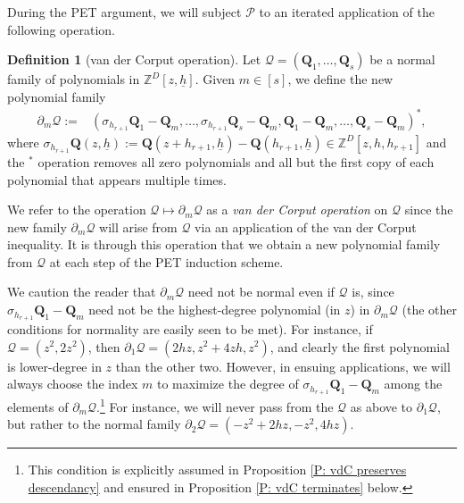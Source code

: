 \documentclass[11pt]{amsart}
\theoremstyle{definition}
\newtheorem{definition}[lemma]{Definition}
\newcommand{\Z}{{\mathbb Z}}
\newcommand{\CP}{{\mathcal P}}
\newcommand{\CQ}{{\mathcal Q}}
\newcommand{\q}{{\mathbf{Q}}}
\newcommand{\uh}{{\underline{h}}}
\begin{document}
 During the PET argument, we will subject $\CP$ to an iterated application of the following operation.
      \begin{definition}[van der Corput operation]
          Let $\CQ = (\q_1, \ldots, \q_s)$ be a normal family of polynomials in $\Z^D[z,\uh]$. Given $m\in[s]$, we define the new polynomial family
      \begin{align*}
            \partial_m\CQ := &(\sigma_{h_{r+1}}{\q}_1-{\q}_m, \ldots, \sigma_{h_{r+1}}{\q}_s - {\q}_m, {\q}_1-{\q}_m, \ldots,  {\q}_s-{\q}_m)^*,
      \end{align*}
      where $\sigma_{h_{r+1}}\q(z, \uh) := \q(z+h_{r+1}, \uh) - \q(h_{r+1}, \uh)\in \mathbb{Z}^D[z,h,h_{r+1}]$
      and the $^*$ operation removes all zero polynomials and all but the first copy of each polynomial that appears multiple times.
            \end{definition}
            We refer to the operation $\CQ\mapsto \partial_m \CQ$ as a \textit{van der Corput operation} on $\CQ$ since the new family $\partial_m \CQ$ will arise from $\CQ$ via an application of the van der Corput inequality. It is through this operation that we obtain a new polynomial family from $\CQ$ at each step of the PET induction scheme.  

            {We caution the reader that $\partial_m \CQ$ need not be normal even if $\CQ$ is, since $\sigma_{h_{r+1}}{\q}_1-{\q}_m$ need not be the highest-degree polynomial (in $z$) in $\partial_m\CQ$ (the other conditions for normality are easily seen to be met). For instance, if $\CQ = (z^2, 2z^2)$, then $\partial_1 \CQ = (2h z, z^2 + 4zh, z^2)$, and clearly the first polynomial is lower-degree in $z$ than the other two. However, in ensuing applications, we will always choose the index $m$ to maximize the degree of $\sigma_{h_{r+1}}{\q}_1-{\q}_m$ among the elements of $\partial_m \CQ$.\footnote{This condition is explicitly assumed in Proposition \ref{P: vdC preserves descendancy} and ensured in Proposition \ref{P: vdC terminates} below.} For instance, we will never pass from the $\CQ$ as above to $\partial_1\CQ$, but rather to the normal family $\partial_2\CQ = (-z^2 + 2hz, -z^2, 4hz)$.}
\end{document}
